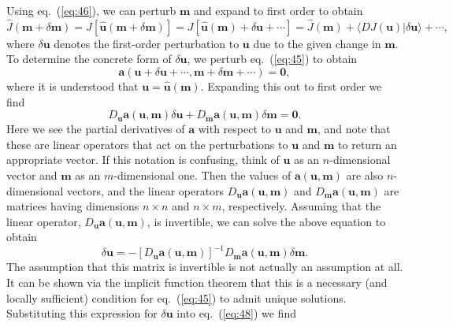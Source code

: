 Using eq.~(\ref{eq:46}), we can perturb $\mathbf{m}$ and expand to first order to obtain
\begin{equation}
\hat{J}(\mathbf{m}+\delta \mathbf{m})=J[\hat{\mathbf{u}}(\mathbf{m}+\delta \mathbf{m})]=
J[\hat{\mathbf{u}}(\mathbf{m})+\delta \mathbf{u}+\cdots]=\hat{J}(\mathbf{m})+
\langle DJ(\mathbf{u})|\delta \mathbf{u}\rangle+\cdots,
\label{eq:48}
\end{equation}
where $\delta \mathbf{u}$ denotes the first-order perturbation to $\mathbf{u}$ due to the given change in $\mathbf{m}$. To determine the concrete form of $\delta \mathbf{u}$, we perturb eq.~(\ref{eq:45}) to obtain
\begin{equation}
\mathbf{a}(\mathbf{u}+\delta \mathbf{u}+\cdots,\mathbf{m}+\delta \mathbf{m}+\cdots)=\mathbf{0},
\label{eq:49}
\end{equation}
where it is understood that $\mathbf{u}=\hat{\mathbf{u}}(\mathbf{m})$. Expanding this out to first order we find
\begin{equation}
D_{\mathbf{u}}\mathbf{a}(\mathbf{u},\mathbf{m})\delta \mathbf{u}+D_{\mathbf{m}}\mathbf{a}(\mathbf{u},\mathbf{m})\delta \mathbf{m}=\mathbf{0}.
\label{eq:50}
\end{equation}
Here we see the partial derivatives of $\mathbf{a}$ with respect to $\mathbf{u}$ and $\mathbf{m}$, and note that these are linear operators that act on the perturbations to $\mathbf{u}$ and $\mathbf{m}$ to return an appropriate vector. If this notation is confusing, think of $\mathbf{u}$ as an $n$-dimensional vector and $\mathbf{m}$ as an $m$-dimensional one. Then the values of $\mathbf{a}(\mathbf{u},\mathbf{m})$ are also $n$-dimensional vectors, and the linear operators $D_{\mathbf{u}}\mathbf{a}(\mathbf{u},\mathbf{m})$ and $D_{\mathbf{m}}\mathbf{a}(\mathbf{u},\mathbf{m})$ are matrices having dimensions $n\times n$ and $n\times m$, respectively. Assuming that the linear operator, $D_{\mathbf{u}}\mathbf{a}(\mathbf{u},\mathbf{m})$, is invertible, we can solve the above equation to obtain
\begin{equation}
\delta \mathbf{u}=-[D_{\mathbf{u}}\mathbf{a}(\mathbf{u},\mathbf{m})]^{-1}D_{\mathbf{m}}\mathbf{a}(\mathbf{u},\mathbf{m})\delta \mathbf{m}.
\label{eq:51}
\end{equation}
The assumption that this matrix is invertible is not actually an assumption at all. It can be shown via the implicit function theorem that this is a necessary (and locally sufficient) condition for eq.~(\ref{eq:45}) to admit unique solutions. Substituting this expression for $\delta \mathbf{u}$ into eq.~(\ref{eq:48}) we find
